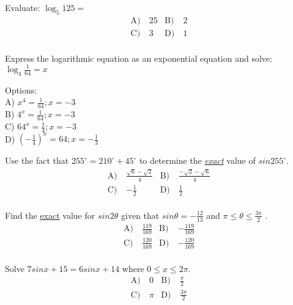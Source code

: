 \begin{problem}\label{PreCal-1}
Evaluate: $\log_5{125} = $
\begin{align*}

\text{A)}\ & 25 &
\text{B)}\ & 2  \\
\text{C)}\ & 3  &
\text{D)}\ & 1\\
\end{align*}
\end{problem}


\begin{problem}\label{AI-Algebra9}
Express the logarithmic equation as an exponential equation and solve: \(\log_4 \frac{1}{64} = x\)

\noindent Options:\\
A) \( x^4 = \frac{1}{64}; x = -3 \)\\
B) \( 4^x = \frac{1}{64}; x = -3 \)\\
C) \( 64^x = \frac{1}{4}; x = -3 \)\\
D) \( \left(-\frac{1}{4}\right)^x = 64; x = -\frac{1}{3} \)
\end{problem}


\begin{problem}\label{PreCal-3}
Use the fact that $255^{\circ} = 210^{\circ} + 45^{\circ}$ to determine the \textit{\underline{exact}} value of $sin 255^{\circ}$.
\begin{align*}
\text{A)}\ & \frac{\sqrt{6}-\sqrt{2}}{4} & 
\text{B)}\ & \frac{-\sqrt{2}-\sqrt{6}}{4} \\
\text{C)}\ & -\frac{1}{2} &
\text{D)}\ & \frac{1}{2} \\
\end{align*}
\end{problem}


\begin{problem}\label{PreCal-4}
Find the \underline{exact} value for $sin2\theta$  given that   $sin\theta = -\frac{12}{13}$ and $\pi\leq\theta\leq\frac{3\pi}{2}$ . 
\begin{align*}
\text{A)}\ & \frac{119}{169} &
\text{B)}\ & -\frac{119}{169}  \\
\text{C)}\ & \frac{120}{169}  &
\text{D)}\ & -\frac{120}{169}\\
\end{align*}    
\end{problem}


\begin{problem}\label{PreCal-5}
Solve $7sinx+15=6sinx+14$ where $0\leq x \leq 2\pi$. 
\begin{align*}
\text{A)}\ & 0 &
\text{B)}\ & \frac{\pi}{2}  \\
\text{C)}\ & \pi &
\text{D)}\ & \frac{3\pi}{2}\\
\end{align*}    
\end{problem}


